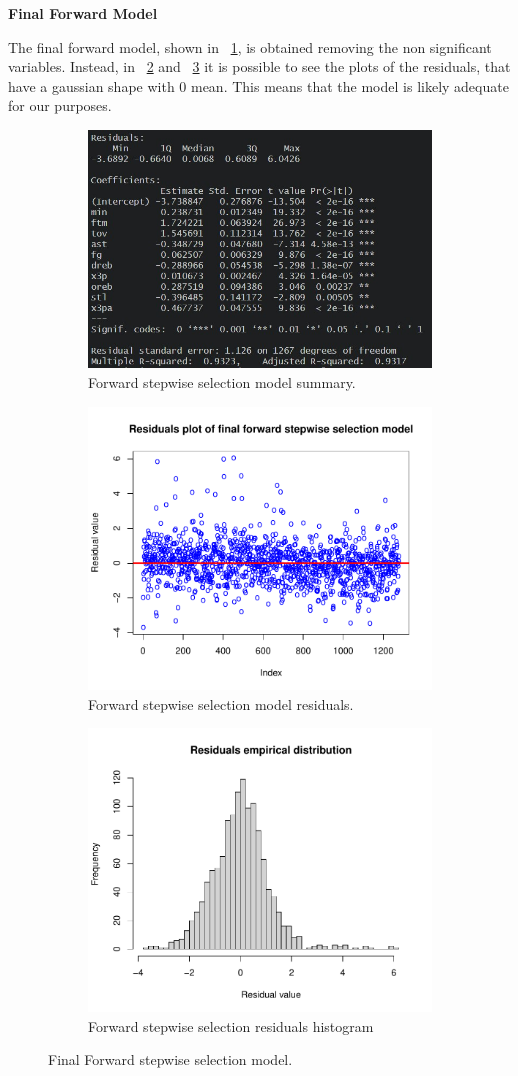 \vspace{0.2cm}
\noindent
\textbf{Final Forward Model}

The final forward model, shown in \Fig~\ref{fig:ForwardFinalModelSummary}, is obtained removing the non significant variables. Instead, in \Fig~\ref{fig:ForwardFinalModelResiduals} and \Fig~\ref{fig:ForwardFinalModelResidualsDist} it is possible to see the plots of the residuals, that have a gaussian shape with 0 mean. This means that the model is likely adequate for our purposes.

\begin{figure}[h]
	\centering
	\begin{subfigure}{.6\textwidth}
		\centering
		\includegraphics[width=0.5\linewidth]{ImageFiles/Regression/Forward/ForwardFinalModelSummary}
		\caption{Forward stepwise selection model summary.}
		\label{fig:ForwardFinalModelSummary}
	\end{subfigure}
	\begin{subfigure}{.6\textwidth}
		\centering
		\includegraphics[width=0.5\linewidth]{ImageFiles/Regression/Forward/ForwardFinalModelResiduals}
		\caption{Forward stepwise selection model residuals.}
		\label{fig:ForwardFinalModelResiduals}
	\end{subfigure}%
	\begin{subfigure}{.6\textwidth}
		\centering
		\includegraphics[width=0.5\linewidth]{ImageFiles/Regression/Forward/ForwardFinalModelResidualsDist}
		\caption{Forward stepwise selection residuals histogram}
		\label{fig:ForwardFinalModelResidualsDist}
	\end{subfigure}
	\caption{Final Forward stepwise selection model.}
	\label{fig:FinalFSSM}
\end{figure}


